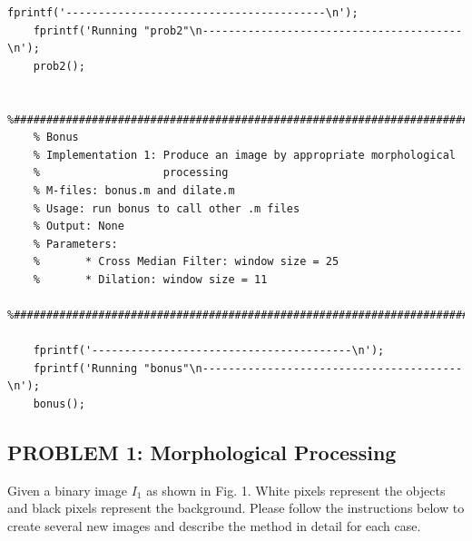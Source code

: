 \documentclass{article}
\begin{document}
\begin{lstlisting}[caption = {README.m}]
    fprintf('----------------------------------------\n');
    fprintf('Running "prob2"\n----------------------------------------\n');
    prob2();
    
    %######################################################################### 
    % Bonus                                           
    % Implementation 1: Produce an image by appropriate morphological
    %                   processing
    % M-files: bonus.m and dilate.m
    % Usage: run bonus to call other .m files
    % Output: None
    % Parameters:
    %       * Cross Median Filter: window size = 25
    %       * Dilation: window size = 11
    %#########################################################################
    
    fprintf('----------------------------------------\n');
    fprintf('Running "bonus"\n----------------------------------------\n');
    bonus();      
\end{lstlisting}

\newpage
\subsection*{PROBLEM 1: Morphological Processing}

    Given a binary image $I_1$ as shown in Fig. 1. White pixels represent the objects and black pixels represent the background. Please follow the instructions below to create several new images and describe the method in detail for each case.
\end{document}
